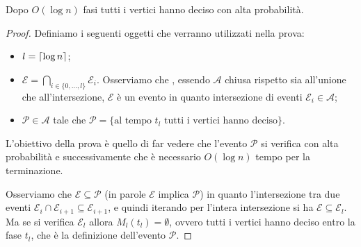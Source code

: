 \documentclass{article}
\begin{document}
\begin{theorem}
    Dopo $O(\log{n})$ fasi tutti i vertici hanno deciso con alta probabilit\`a.
\end{theorem}

\begin{proof}
    Definiamo i seguenti oggetti che verranno utilizzati nella prova:
    \begin{itemize}
        \item $l = \lceil \log{n} \rceil$;
        \item $\mathcal{E} = \bigcap_{i \in 
            \lbrace 0, \ldots, l \rbrace}{\mathcal{E}_i}$. Osserviamo che 
            , essendo $\mathcal{A}$  chiusa 
            rispetto sia all'unione che all'intersezione, $\mathcal{E}$ 
            \`e un evento in quanto intersezione di eventi $\mathcal{E}_i 
            \in \mathcal{A}$;
        \item $\mathcal{P} \in \mathcal{A}$ tale che $\mathcal{P} = 
            \lbrace \text{al tempo $t_l$ tutti i vertici hanno deciso} \rbrace$.
    \end{itemize}

    L'obiettivo della prova \`e quello di far vedere che l'evento 
    $\mathcal{P}$ si verifica con alta probabilit\`a e successivamente
    che \`e necessario $O(\log{n})$ tempo per la terminazione. 

    Osserviamo che $\mathcal{E}\subseteq\mathcal{P}$ (in parole $\mathcal{E}$ 
    implica $\mathcal{P}$) in quanto l'intersezione tra due eventi 
    $\mathcal{E}_i \cap \mathcal{E}_{i+1} \subseteq \mathcal{E}_{i+1}$,
    e quindi iterando per l'intera intersezione si ha $\mathcal{E} 
    \subseteq \mathcal{E}_l$. Ma se si verifica $\mathcal{E}_l$ allora
    $M_l(t_l) = \emptyset$, ovvero tutti i vertici hanno deciso entro la fase
    $t_l$, che \`e la definizione dell'evento $\mathcal{P}$.


\end{proof}
\end{document}
